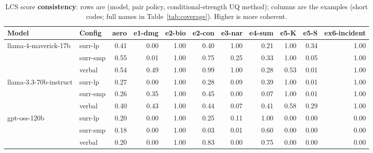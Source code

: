 \documentclass[11pt]{article}
\begin{document}
\begin{table}[htbp]
\centering
\footnotesize
\setlength{\tabcolsep}{3.5pt}
\caption{LCS score \textbf{consistency}: rows are (model, pair policy, conditional-strength UQ method); columns are the examples (short codes; full names in Table~\ref{tab:coverage}). Higher is more coherent.}
\label{tab:consistency}
\begin{tabular}{llrrrrrrrrr}
\toprule
\textbf{Model} & \textbf{Config} & \textbf{aero} & \textbf{e1-dmg} & \textbf{e2-bio} & \textbf{e2-con} & \textbf{e3-nar} & \textbf{e4-sum} & \textbf{e5-K} & \textbf{e5-S} & \textbf{ex6-incident} \\
\midrule
llama-4-maverick-17b & surr-lp & 0.41 & 0.00 & 1.00 & 0.40 & 1.00 & 0.21 & 1.00 & 0.34 & 1.00 \\
 & surr-smp & 0.55 & 0.01 & 1.00 & 0.75 & 0.25 & 0.33 & 1.00 & 0.05 & 1.00 \\
 & verbal & 0.54 & 0.49 & 1.00 & 0.99 & 1.00 & 0.28 & 0.53 & 0.01 & 1.00 \\
\midrule
llama-3.3-70b-instruct & surr-lp & 0.27 & 0.00 & 1.00 & 0.28 & 0.09 & 0.39 & 1.00 & 0.01 & 1.00 \\
 & surr-smp & 0.26 & 0.35 & 1.00 & 0.45 & 0.00 & 0.07 & 1.00 & 0.01 & 1.00 \\
 & verbal & 0.40 & 0.43 & 1.00 & 0.44 & 0.07 & 0.41 & 0.58 & 0.29 & 1.00 \\
\midrule
gpt-oss-120b & surr-lp & 0.20 & 0.00 & 1.00 & 0.25 & 0.11 & 1.00 & 0.00 & 0.00 & 0.00 \\
 & surr-smp & 0.18 & 0.00 & 1.00 & 0.03 & 0.01 & 0.60 & 0.00 & 0.00 & 0.00 \\
 & verbal & 0.20 & 0.00 & 1.00 & 0.83 & 0.00 & 0.75 & 0.00 & 0.00 & 0.00 \\
\bottomrule
\end{tabular}
\end{table}
\end{document}
